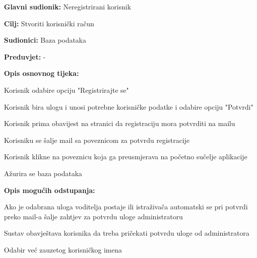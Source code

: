 					\noindent {}
					\begin{packed_item}
	
						\item \textbf{Glavni sudionik: }Neregistrirani korisnik
						\item  \textbf{Cilj:} Stvoriti korisnički račun 
						\item  \textbf{Sudionici:} Baza podataka
						\item  \textbf{Preduvjet:} -
						\item  \textbf{Opis osnovnog tijeka:} 
						
						
						\item[] \begin{packed_enum}
	
							\item Korisnik odabire opciju "Registrirajte se"						
							\item Korisnik bira ulogu i unosi potrebne korisničke podatke i odabire opciju "Potvrdi"
							\item Korisnik prima obavijest na stranici da registraciju mora potvrditi na mailu
							\item Korisniku se šalje mail sa poveznicom za potvrdu registracije
							\item Korisnik klikne na poveznicu koja ga preusmjerava na početno sučelje aplikacije
							\item Ažurira se baza podataka
							
						\end{packed_enum}
						
						\item  \textbf{Opis mogućih odstupanja:}
						
						\item[] \begin{packed_item}
							\item[2.a] Ako je odabrana uloga voditelja postaje ili istraživača automatski se pri potvrdi preko mail-a šalje zahtjev za potvrdu uloge administratoru
							
							\item[] \begin{packed_enum}
								\item Sustav obavještava korisnika da treba pričekati potvrdu uloge od administratora 
								     \end{packed_enum}
							\item[2.b] Odabir već zauzetog korisničkog imena
							

\end{packed_item}
\end{packed_item}
